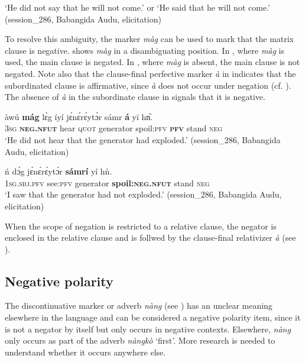 \documentclass[output=paper,colorlinks,citecolor=brown]{langscibook}
\begin{document}
    \glt \small{‘He did not say that he will not come.’ or ‘He said that he will not come.’ (session\_286, Babangida Audu, elicitation)}
\z 


To resolve this ambiguity, the marker \textit{màg} can be used to mark that the matrix clause is negative.  shows \textit{màg} in a disambiguating position. In , where \textit{màg} is used, the main clause is negated. In , where \textit{màg} is absent, the main clause is not negated. Note also that the clause-final perfective marker \textit{à} in  indicates that the subordinated clause is affirmative, since \textit{à} does not occur under negation (cf. ). The absence of \textit{à} in the subordinate clause in  signals that it is negative.

\ea\label{ex:kam:80} 
    \gll àwú \textbf{mág} lɛ̀g íyí jɛ́nɛ́rɛ́ytɔ̀r sámr \textbf{á} yī hn᷆. \\
        \textsc{3sg} \textbf{\textsc{neg}}\textbf{.\textsc{nfut}} hear \textsc{quot} generator spoil:\textsc{pfv} \textbf{\textsc{pfv}} stand \textsc{neg}\\
    \glt ‘He did not hear that the generator had exploded.’ (session\_286, Babangida Audu, elicitation)
\z 

\ea\label{ex:kam:81} 
    \gll ń dɔ́g jɛ́nɛ́rɛ́ytɔ̀r \textbf{sámrí} yí hǹ.\\
        \textsc{1sg.sbj.pfv} see:\textsc{pfv} generator \textbf{spoil:\textsc{neg}}\textbf{.\textsc{nfut}} stand \textsc{neg}\\
    \glt ‘I saw that the generator had not exploded.’ (session\_286, Babangida Audu, elicitation)
\z 

When the scope of negation is restricted to a relative clause, the negator is enclosed in the relative clause and is follwed by the clause-final relativizer \textit{à} (see ).

\subsection{Negative polarity}\label{sec:kam:4.2}

The discontinuative marker or adverb \textit{nàng} (see ) has an unclear meaning elsewhere in the language and can be considered a negative polarity item, since it is not a negator by itself but only occurs in negative contexts. Elsewhere, \textit{nàng} only occurs as part of the adverb \textit{nàngkò} ‘first’. More research is needed to understand whether it occurs anywhere else.
\end{document}
